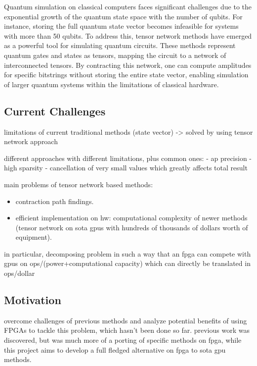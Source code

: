 \documentclass[12pt,oneside,a4paper]{article}
\begin{document}
Quantum simulation on classical computers faces significant challenges due to the exponential growth of the quantum state space with the number of qubits. For instance, storing the full quantum state vector becomes infeasible for systems with more than 50 qubits. To address this, tensor network methods have emerged as a powerful tool for simulating quantum circuits. These methods represent quantum gates and states as tensors, mapping the circuit to a network of interconnected tensors. By contracting this network, one can compute amplitudes for specific bitstrings without storing the entire state vector, enabling simulation of larger quantum systems within the limitations of classical hardware.


\subsection{Current Challenges}
limitations of current traditional methods (state vector) -> solved by using tensor network approach

different approaches with different limitations, plus common ones:
- ap precision
- high sparsity
- cancellation of very small values which greatly affects total result


main problems of tensor network based methods:
\begin{itemize}
	\item contraction path findings.
	\item efficient implementation on hw: computational complexity of newer methods (tensor network on sota gpus with hundreds of thousands of dollars worth of equipment).
\end{itemize}

in particular, decomposing problem in such a way that an fpga can compete with gpus on ops/(power+computational capacity) which can directly be translated in ops/dollar

\subsection{Motivation}
overcome challenges of previous methods and analyze potential benefits of using FPGAs to tackle this problem, which hasn't been done so far. previous work was discovered, but was much more of a porting of specific methods on fpga, while this project aims to develop a full fledged alternative on fpga to sota gpu methods.
\end{document}
